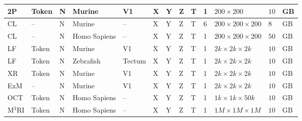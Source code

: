 \documentclass[12pt]{article}
\begin{document}
\begin{table}[h!]
\begin{center}
\begin{tabular}{|l|l|l|l|l|l|l|l|l|l|l|l l|}
\hline 2P & Token 		& N & Murine 			& V1 		& X & Y & Z & T & 1  & $200 \times 200$ 			& $10$ 	& GB   \\ %
\hline CL & -- 			& N & Murine 			& -- 		& X & Y & Z & T & 6  & $200 \times 200 \times 200$  & $8$   & GB \\ %
\hline CL & -- 			& N & Homo Sapiens 		& -- 		& X & Y & Z & T & 1  & $200 \times 200 \times 200$  & $50$  & GB   \\ %
\hline LF & Token 		& N & Murine 			& V1 		& X & Y & Z & T & 1  & $2k \times 2k \times 2k$ 	& $10$  & GB  \\ %
\hline LF & Token 		& N & Zebrafish 		& Tectum 	& X & Y & Z & T & 1  & $2k \times 2k \times 2k$ 	& $10$  & GB  \\ %
\hline XR & Token 		& N & Murine 			& V1 		& X & Y & Z & T & 1  & $2k \times 2k \times 2k$ 	& $10$  & GB \\ %
\hline ExM & -- 		& N & Murine 			& V1 		& X & Y & Z & T & 1  & $2k \times 2k \times 2k$ 	& $10$  & GB \\ %
\hline OCT& Token 		& N & Homo Sapiens 		& -- 		& X & Y & Z & T & 1  & $1k \times 1k \times 50k$ 	& $10$  & GB  \\ %
\hline M$^3$RI 	& Token & N & Homo Sapiens   	& -- 		& X & Y & Z & T & 1  & $1M \times 1M \times 1M$		& $10$  & GB  \\ %
\hline 
\hline

\end{tabular}
\end{center}
\vspace{-10pt}
\end{table}
\end{document}
